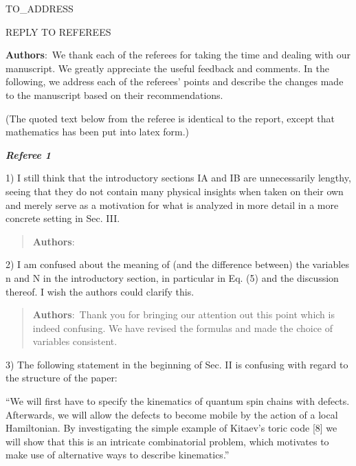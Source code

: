 \documentclass[a4paper,10pt]{letter}
\begin{document}
\begin{letter}{TO_ADDRESS}

	
\begin{center}
REPLY TO REFEREES
\end{center}

\textbf{Authors}:\ We thank each of the referees for taking the time and dealing with our manuscript. We greatly appreciate the useful feedback and comments. In the following, we address each of the referees' points and describe the changes made to the manuscript based on their recommendations.

(The quoted text below from the referee is identical to the report, except that mathematics has been put into latex form.)
\vspace{0.5cm}

\begin{center}
	\textit{\textbf{Referee 1}}
\end{center}

1) I still think that the introductory sections IA and IB are 
unnecessarily lengthy, seeing that they do not contain many physical 
insights when taken on their own and merely serve as a motivation for 
what is analyzed in more detail in a more concrete setting in Sec. 
III. 

\begin{quote}
	\textbf{Authors}:\ 
\end{quote}

2) I am confused about the meaning of (and the difference between) the 
variables n and N in the introductory section, in particular in Eq. 
(5) and the discussion thereof. I wish the authors could clarify this. 

\begin{quote}
	\textbf{Authors}:\ Thank you for bringing our attention out this point which is indeed confusing. We have revised the formulas and made the choice of variables consistent.
\end{quote}

3) The following statement in the beginning of Sec. II is confusing 
with regard to the structure of the paper: 

``We will first have to specify the kinematics of quantum spin chains 
with defects. Afterwards, we will allow the defects to become mobile 
by the action of a local Hamiltonian. By investigating the simple 
example of Kitaev's toric code [8] we will show that this is an 
intricate combinatorial problem, which motivates to make use of 
alternative ways to describe kinematics.''


\end{letter}
\end{document}
